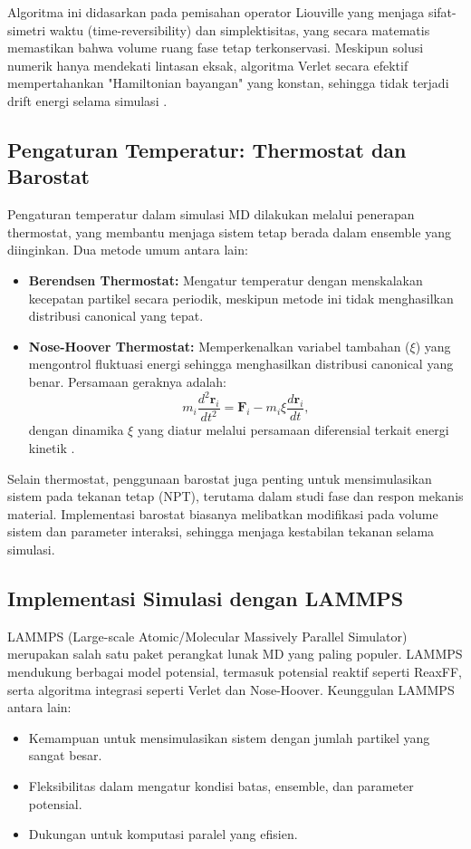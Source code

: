 Algoritma ini didasarkan pada pemisahan operator Liouville yang menjaga sifat-simetri waktu (time-reversibility) dan simplektisitas, yang secara matematis memastikan bahwa volume ruang fase tetap terkonservasi. Meskipun solusi numerik hanya mendekati lintasan eksak, algoritma Verlet secara efektif mempertahankan "Hamiltonian bayangan" yang konstan, sehingga tidak terjadi drift energi selama simulasi \citep{Allen1989}. \subsection{Pengaturan Temperatur: Thermostat dan Barostat}
Pengaturan temperatur dalam simulasi MD dilakukan melalui penerapan thermostat, yang membantu menjaga sistem tetap berada dalam ensemble yang diinginkan. Dua metode umum antara lain:
\begin{itemize}
    \item \textbf{Berendsen Thermostat:} Mengatur temperatur dengan menskalakan kecepatan partikel secara periodik, meskipun metode ini tidak menghasilkan distribusi canonical yang tepat. \item \textbf{Nose-Hoover Thermostat:} Memperkenalkan variabel tambahan (\(\xi\)) yang mengontrol fluktuasi energi sehingga menghasilkan distribusi canonical yang benar. Persamaan geraknya adalah:
    \begin{equation}
        m_i \frac{d^2 \mathbf{r}_i}{dt^2} = \mathbf{F}_i - m_i \xi \frac{d\mathbf{r}_i}{dt},
    \end{equation}
    dengan dinamika \(\xi\) yang diatur melalui persamaan diferensial terkait energi kinetik \citep{Allen1989}. \end{itemize}

Selain thermostat, penggunaan barostat juga penting untuk mensimulasikan sistem pada tekanan tetap (NPT), terutama dalam studi fase dan respon mekanis material. Implementasi barostat biasanya melibatkan modifikasi pada volume sistem dan parameter interaksi, sehingga menjaga kestabilan tekanan selama simulasi. \subsection{Implementasi Simulasi dengan LAMMPS}
LAMMPS (Large-scale Atomic/Molecular Massively Parallel Simulator) merupakan salah satu paket perangkat lunak MD yang paling populer. LAMMPS mendukung berbagai model potensial, termasuk potensial reaktif seperti ReaxFF, serta algoritma integrasi seperti Verlet dan Nose-Hoover. Keunggulan LAMMPS antara lain:
\begin{itemize}
    \item Kemampuan untuk mensimulasikan sistem dengan jumlah partikel yang sangat besar. \item Fleksibilitas dalam mengatur kondisi batas, ensemble, dan parameter potensial.
    \item Dukungan untuk komputasi paralel yang efisien. \end{itemize}

